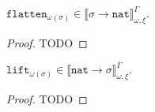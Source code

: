 \documentclass[runningheads,a4paper]{llncs}
\newcommand{\subst}[2]{#1:=#2}
\newcommand{\nat}{\mathtt{nat}}
\newcommand{\flatten}{\mathtt{flatten}}
\newcommand{\lift}{\mathtt{lift}}
\newcommand{\SN}{\mathrm{SN}}
\newcommand{\val}[3]{\ensuremath{\llbracket#1\rrbracket_{#2}^{#3}}}
\begin{document}
\begin{lemma}
  $\flatten_{\omega(\sigma)} \in
  \val{\sigma\to\nat}{\omega,\xi}{\Gamma}$.
\end{lemma}

\begin{proof}
  TODO
\end{proof}

\begin{lemma}
  $\lift_{\omega(\sigma)} \in
  \val{\nat\to\sigma}{\omega,\xi}{\Gamma}$.
\end{lemma}

\begin{proof}
  TODO
\end{proof}

%
\end{document}
